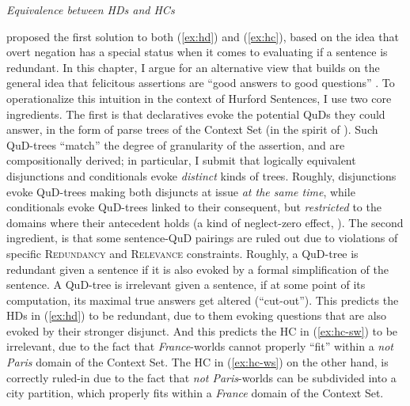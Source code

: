 \begin{exe}
	\ex \textit{Equivalence between HDs and HCs} \label{ex:hd-hc-derivation}
	\begin{xlist}
	\end{xlist}
\end{exe}
\citet{Kalomoiros2024} proposed the first solution to both (\ref{ex:hd}) and (\ref{ex:hc}), based on the idea that overt negation has a special status when it comes to evaluating if a sentence is redundant. In this chapter, I argue for an alternative view that builds on the general idea that felicitous assertions are ``good answers to good questions'' \cite{Katzir2015}. To operationalize this intuition in the context of Hurford Sentences, I use two core ingredients. The first is that declaratives evoke the potential QuDs they could answer, in the form of parse trees of the Context Set (in the spirit of \cite{Buring2003,Zhang2024}). Such QuD-trees ``match'' the degree of granularity of the assertion, and are compositionally derived; in particular, I submit that logically equivalent disjunctions and conditionals evoke \textit{distinct} kinds of trees. Roughly, disjunctions evoke QuD-trees making both disjuncts at issue \textit{at the same time}, while conditionals evoke QuD-trees linked to their consequent, but \textit{restricted} to the domains where their antecedent holds (a kind of neglect-zero effect, \cite{Aloni2022}). The second ingredient, is that some sentence-QuD pairings are ruled out due to violations of specific \textsc{Redundancy} and \textsc{Relevance} constraints. Roughly, a QuD-tree is redundant given a sentence if it is also evoked by a formal simplification of the sentence. A QuD-tree is irrelevant given a sentence, if at some point of its computation, its maximal true answers get altered (``cut-out''). This predicts the HDs in (\ref{ex:hd}) to be redundant, due to them evoking questions that are also evoked by their stronger disjunct. And this predicts the HC in (\ref{ex:hc-sw}) to be irrelevant, due to the fact that \textit{France}-worlds cannot properly ``fit'' within a \textit{not Paris} domain of the Context Set. The HC in (\ref{ex:hc-ws}) on the other hand, is correctly ruled-in due to the fact that \textit{not Paris}-worlds can be subdivided into a city partition, which properly fits within a \textit{France} domain of the Context Set.

